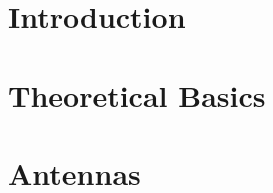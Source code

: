 \documentclass[11pt]{article}
\begin{document}
\noindent

\cleardoublepage
\fi

	\tableofcontents  

\newpage
	\listoffigures 

\newpage
	\listoftables
	
\cleardoublepage

\pagestyle{headings}

\section{Introduction}

\section{Theoretical Basics}







\section{Antennas}



\newpage

\cleardoublepage
\printbibliography
\end{document}

